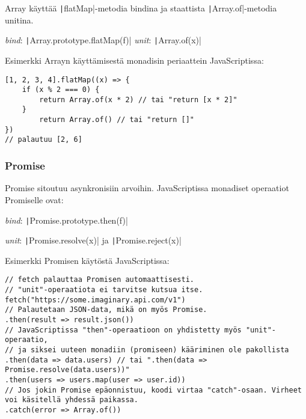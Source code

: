 Array käyttää \texttt|flatMap|-metodia bindina ja staattista \texttt|Array.of|-metodia unitina.

\textit{bind}: \texttt|Array.prototype.flatMap(f)|
\textit{unit}: \texttt|Array.of(x)|

Esimerkki Arrayn käyttämisestä monadisin periaattein JavaScriptissa:

\begin{code}
    \begin{verbatim}
[1, 2, 3, 4].flatMap((x) => {
    if (x % 2 === 0) {
        return Array.of(x * 2) // tai "return [x * 2]"
    }
        return Array.of() // tai "return []"
})
// palautuu [2, 6]
\end{verbatim}
    \caption{Array-tietorakenteella monadinen bind-operaatio, jossa poistetaan parittomat luvut ja parilliset kerrotaan kahdella.}
    \label{code:array_monad_fr}
\end{code}


\subsubsection{Promise}

Promise sitoutuu asynkronisiin arvoihin. JavaScriptissa monadiset operaatiot Promiselle ovat:

\textit{bind}: \texttt|Promise.prototype.then(f)|

\textit{unit}: \texttt|Promise.resolve(x)| ja \texttt|Promise.reject(x)|

Esimerkki Promisen käytöstä JavaScriptissa:

\begin{code}
    \begin{verbatim}
// fetch palauttaa Promisen automaattisesti.
// "unit"-operaatiota ei tarvitse kutsua itse.
fetch("https://some.imaginary.api.com/v1") 
// Palautetaan JSON-data, mikä on myös Promise.
.then(result => result.json()) 
// JavaScriptissa "then"-operaatioon on yhdistetty myös "unit"-operaatio,
// ja siksei uuteen monadiin (promiseen) kääriminen ole pakollista
.then(data => data.users) // tai ".then(data => Promise.resolve(data.users))"
.then(users => users.map(user => user.id))
// Jos jokin Promise epäonnistuu, koodi virtaa "catch"-osaan. Virheet voi käsitellä yhdessä paikassa.
.catch(error => Array.of()) 
\end{verbatim}
    \caption{Promise-tietorakenteella bind-operaatioden ketjutus, jossa haetaan käyttäjätietoja kuvitteellisesta ulkoisesta rajapinnasta}
    \label{code:promise_monad_fr}
\end{code}

